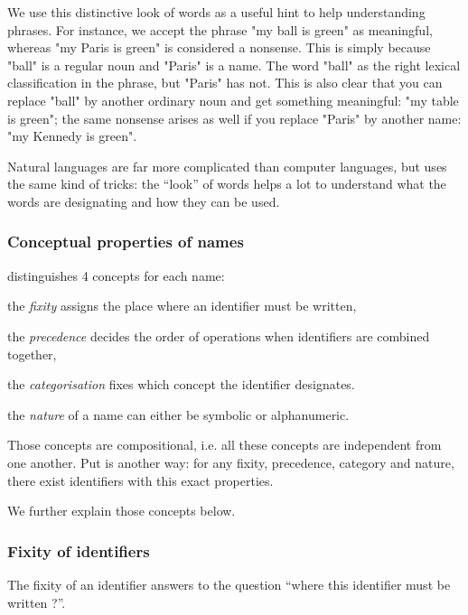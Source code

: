 We use this distinctive look of words as a useful hint to help understanding
phrases. For instance, we accept the phrase "my ball is green" as meaningful,
whereas "my Paris is green" is considered a nonsense. This is simply because
"ball" is a regular noun and "Paris" is a name. The word "ball" as the right
lexical classification in the phrase, but "Paris" has not. This is also clear
that you can replace "ball" by another ordinary noun and get something
meaningful: "my table is green"; the same nonsense arises as well if you
replace "Paris" by another name: "my Kennedy is green".

Natural languages are far more complicated than computer languages, but
{\focalize} uses the same kind of tricks: the ``look'' of words helps a lot to
understand what the words are designating and how they can be used.

\subsubsection{Conceptual properties of names}

{\focal} distinguishes 4 concepts for each name:

\begin{citemize}
\item the {\em fixity} assigns the place where an identifier must be written,
\item the {\em precedence} decides the order of operations when
  identifiers are combined together,
\item the {\em categorisation} fixes which concept the identifier designates.
\item the {\em nature} of a name can either be symbolic or alphanumeric.
\end{citemize}

Those concepts are compositional, i.e. all these concepts are independent
from one another. Put is another way: for any fixity, precedence, category and nature,
there exist identifiers with this exact properties.

We further explain those concepts below.

\subsubsection{Fixity of identifiers}

The fixity of an identifier answers to the question ``where this identifier
must be written ?''.

